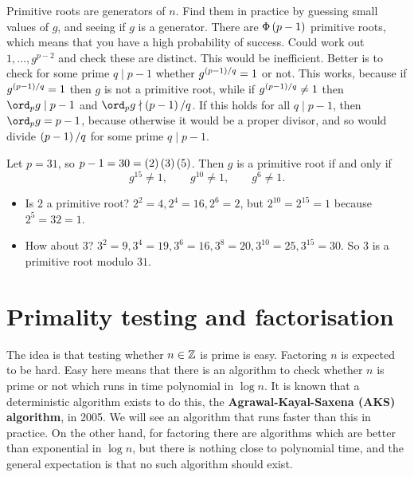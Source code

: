 
Primitive roots are generators of $ \unit{n} $. Find them in practice by guessing small values of $ g $, and seeing if $ g $ is a generator. There are $ \Phi\br{p - 1} $ primitive roots, which means that you have a high probability of success. Could work out $ 1, \dots, g^{p - 2} $ and check these are distinct. This would be inefficient. Better is to check for some prime $ q \mid p - 1 $ whether $ g^{\br{p - 1} / q} = 1 $ or not. This works, because if $ g^{\br{p - 1} / q} = 1 $ then $ g $ is not a primitive root, while if $ g^{\br{p - 1} / q} \ne 1 $ then $ \ord_p g \mid p - 1 $ and $ \ord_p g \nmid \br{p - 1} / q $. If this holds for all $ q \mid p - 1 $, then $ \ord_p g = p - 1 $, because otherwise it would be a proper divisor, and so would divide $ \br{p - 1} / q $ for some prime $ q \mid p - 1 $.

\begin{example*}
Let $ p = 31 $, so $ p - 1 = 30 = \br{2}\br{3}\br{5} $. Then $ g $ is a primitive root if and only if
$$ g^{15} \ne 1, \qquad g^{10} \ne 1, \qquad g^{6} \ne 1. $$
\begin{itemize}
\item Is $ 2 $ a primitive root? $ 2^2 = 4, 2^4 = 16, 2^6 = 2 $, but $ 2^{10} = 2^{15} = 1 $ because $ 2^5 = 32 = 1 $.
\item How about $ 3 $? $ 3^2 = 9, 3^4 = 19, 3^6 = 16, 3^8 = 20, 3^{10} = 25, 3^{15} = 30 $. So $ 3 $ is a primitive root modulo $ 31 $.
\end{itemize}
\end{example*}

\pagebreak

\section{Primality testing and factorisation}

The idea is that testing whether $ n \in \mathbb{Z} $ is prime is easy. Factoring $ n $ is expected to be hard. Easy here means that there is an algorithm to check whether $ n $ is prime or not which runs in time polynomial in $ \log n $. It is known that a deterministic algorithm exists to do this, the \textbf{Agrawal-Kayal-Saxena (AKS) algorithm}, in 2005. We will see an algorithm that runs faster than this in practice. On the other hand, for factoring there are algorithms which are better than exponential in $ \log n $, but there is nothing close to polynomial time, and the general expectation is that no such algorithm should exist.

